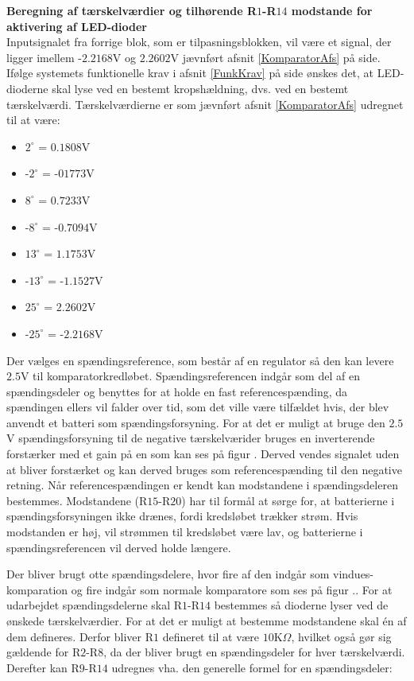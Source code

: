 \noindent\textbf{Beregning af tærskelværdier og tilhørende R$1$-R$14$ modstande for aktivering af LED-dioder} \\
Inputsignalet fra forrige blok, som er tilpasningsblokken, vil være et signal, der ligger imellem -$2.2168$V og $2.2602$V jævnført afsnit \ref{KomparatorAfs} på side\pageref{KomparatorAfs}. Ifølge systemets funktionelle krav i afsnit \ref{FunkKrav} på side \pageref{FunkKrav} ønskes det, at LED-dioderne skal lyse ved en bestemt kropshældning, dvs. ved en bestemt tærskelværdi. %
Tærskelværdierne er som jævnført afsnit \ref{KomparatorAfs} udregnet til at være:
\begin{itemize}
\item $2^{\circ}$ = $0.1808$V
\item -$2^{\circ}$ = -$01773$V
\item $8^{\circ}$ = $0.7233$V
\item -$8^{\circ}$ = -$0.7094$V
\item $13^{\circ}$ = $1.1753$V
\item -$13^{\circ}$ = -$1.1527$V
\item $25^{\circ}$ = $2.2602$V
\item -$25^{\circ}$ = -$2.2168$V
\end{itemize}

Der vælges en  spændingsreference, som består af en regulator så den kan levere $2.5$V til komparatorkredløbet. Spændingsreferencen indgår som del af en spændingsdeler og benyttes for at holde en fast referencespænding, da spændingen ellers vil falder over tid, som det ville være tilfældet hvis, der blev anvendt et batteri som spændingsforsyning. For at det er muligt at bruge den $2.5$V spændingsforsyning til de negative tærskelværider bruges en inverterende forstærker med et gain på en som kan ses på figur . Derved vendes signalet uden at bliver forstærket og kan derved bruges som referencespænding til den negative retning.  
Når referencespændingen er kendt kan modstandene i spændingsdeleren bestemmes. Modstandene (R$15$-R$20$) har til formål at sørge for, at batterierne i spændingsforsyningen ikke drænes, fordi kredsløbet trækker strøm. Hvis modstanden er høj, vil strømmen til kredsløbet være lav, og batterierne i spændingsreferencen vil derved holde længere.

Der bliver brugt otte spændingsdelere, hvor fire af den indgår som vindues-komparation og fire indgår som normale komparatore som ses på figur .. 
For at udarbejdet spændingsdelerne skal R$1$-R$14$ bestemmes så dioderne lyser ved de ønskede tærskelværdier. For at det er muligt at bestemme modstandene skal én af dem defineres.  Derfor bliver R$1$ defineret til at være $10$K$\Omega$, hvilket også gør sig gældende for R$2$-R$8$, da der bliver brugt en spændingsdeler for hver tærskelværdi. Derefter kan R$9$-R$14$ udregnes vha. den generelle formel for en spændingsdeler:

